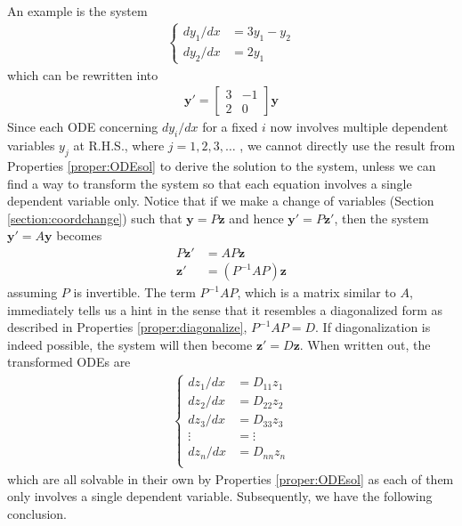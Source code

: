 An example is the system
\begin{align*}
\begin{cases}
dy_1/dx &= 3y_1 - y_2 \\
dy_2/dx &= 2y_1
\end{cases} 
\end{align*}
which can be rewritten into
\begin{align*}
\textbf{y}' =
\begin{bmatrix}
3 & -1 \\
2 & 0
\end{bmatrix}
\textbf{y}
\end{align*}
Since each ODE concerning $dy_i/dx$ for a fixed $i$ now involves multiple dependent variables $y_j$ at R.H.S., where $j = 1,2,3,\ldots$ , we cannot directly use the result from Properties \ref{proper:ODEsol} to derive the solution to the system, unless we can find a way to transform the system so that each equation involves a single dependent variable only. Notice that if we make a change of variables (Section \ref{section:coordchange}) such that $\textbf{y} = P\textbf{z}$ and hence $\textbf{y}' = P\textbf{z}'$, then the system $\textbf{y}' = A\textbf{y}$ becomes
\begin{align*}
P\textbf{z}' &= AP\textbf{z} \\
\textbf{z}' &= (P^{-1}AP)\textbf{z}
\end{align*}
assuming $P$ is invertible. The term $P^{-1}AP$, which is a matrix similar to $A$, immediately tells us a hint in the sense that it resembles a diagonalized form as described in Properties \ref{proper:diagonalize}, $P^{-1}AP = D$. If diagonalization is indeed possible, the system will then become $\textbf{z}' = D\textbf{z}$. When written out, the transformed ODEs are
\begin{align*}
\begin{cases}
dz_1/dx &= D_{11}z_1 \\
dz_2/dx &= D_{22}z_2 \\
dz_3/dx &= D_{33}z_3 \\
\vdots &= \vdots \\
dz_n/dx &= D_{nn}z_n \\
\end{cases}     
\end{align*}
which are all solvable in their own by Properties \ref{proper:ODEsol} as each of them only involves a single dependent variable. Subsequently, we have the following conclusion.
